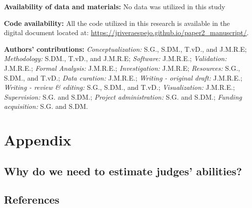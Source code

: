 \documentclass[
  authoryear,
  preprint,
  1p]{elsarticle}
\begin{document}
\textbf{Availability of data and materials:} No data was utilized in
this study

\textbf{Code availability:} All the code utilized in this research is
available in the digital document located at:
\url{https://jriveraespejo.github.io/paper2_manuscript/}.

\textbf{Authors' contributions:} \emph{Conceptualization:} S.G., S.DM.,
T.vD., and J.M.R.E; \emph{Methodology:} S.DM., T.vD., and J.M.R.E;
\emph{Software:} J.M.R.E.; \emph{Validation:} J.M.R.E.; \emph{Formal
Analysis:} J.M.R.E.; \emph{Investigation:} J.M.R.E; \emph{Resources:}
S.G., S.DM., and T.vD.; \emph{Data curation:} J.M.R.E.; \emph{Writing -
original draft:} J.M.R.E.; \emph{Writing - review \& editing:} S.G.,
S.DM., and T.vD.; \emph{Visualization:} J.M.R.E.; \emph{Supervision:}
S.G. and S.DM.; \emph{Project administration:} S.G. and S.DM.;
\emph{Funding acquisition:} S.G. and S.DM.

\newpage{}

\section{Appendix}\label{sec-appendix}

\subsection{Why do we need to estimate judges'
abilities?}\label{sec-appA}

\newpage{}

\subsection*{References}\label{references}

\renewcommand{\bibsection}{}

\end{document}
